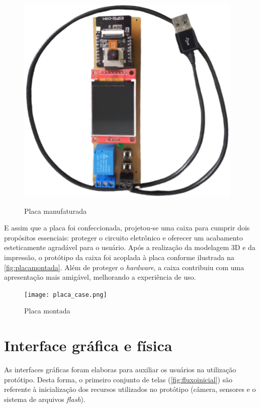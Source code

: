 \begin{figure}[h!]
    \centering
    \caption{Placa manufaturada}
    \includegraphics[scale=0.32]{figuras/placa_montada.png}
    \fonte{}%
    \label{fig:placamanufaturada}
    \centering
\end{figure}

E assim que a placa foi confeccionada, projetou-se uma caixa para cumprir 
dois propósitos essenciais: proteger o circuito eletrônico e oferecer um 
acabamento esteticamente agradável para o usuário. Após a realização da 
modelagem 3D e da impressão, o protótipo da caixa 
foi acoplada à placa conforme ilustrada na \autoref{fig:placamontada}. 
Além de proteger o \textit{hardware}, a caixa contribuiu com uma apresentação 
mais amigável, melhorando a experiência de uso.

\begin{figure}[h!]
    \centering
    \caption{Placa montada}
    \texttt{[image: placa\_case.png]}
    \fonte{}%
    \label{fig:placamontada}
    \centering
\end{figure}

\section{Interface gráfica e física}\label{sec:interfacegrafica}

As interfaces gráficas foram elaboras para auxiliar os 
usuários na utilização protótipo. Desta forma, 
o primeiro conjunto de telas (\autoref{fig:fluxoinicial}) são referente à 
inicialização dos recursos utilizados no protótipo 
(câmera, sensores e o sistema de arquivos \textit{flash}).

